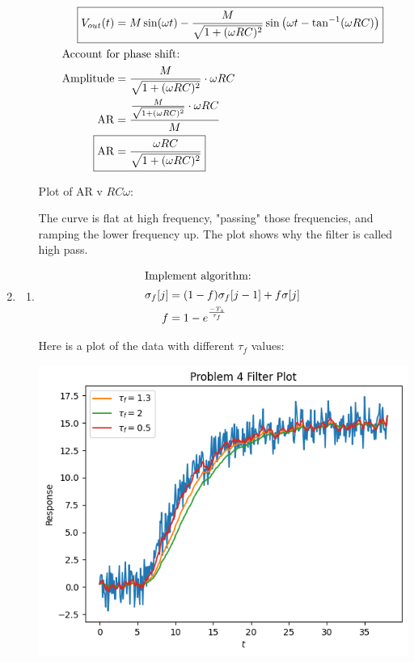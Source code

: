 \documentclass[12pt]{article}
\begin{document}
\begin{enumerate}
\begin{enumerate}
\begin{align*}
        \Aboxed{V_{out}(t) &= M\sin(\omega t) - \frac{M}{\sqrt{1+(\omega RC)^2}} \sin\left(\omega t - \tan^{-1}(\omega RC)\right)} \\
        \intertext{Account for phase shift:}
        \mathrm{Amplitude} &= \frac{M}{\sqrt{1+(\omega RC)^2}} \cdot \omega RC \\
        \mathrm{AR} &= \frac{\frac{M}{\sqrt{1+(\omega RC)^2}} \cdot \omega RC}{M} \\
        \Aboxed{\mathrm{AR} &= \frac{\omega RC}{\sqrt{1+(\omega RC)^2}}}
    \end{align*}

    Plot of AR v $RC\omega$:

    

    The curve is flat at high frequency, "passing" those frequencies, and ramping the lower frequency up. The plot shows why the filter is called high pass.  
\end{enumerate}


\newpage
\item
\begin{enumerate}
    \item 
    \begin{align*}
        \intertext{Implement algorithm:}
        \sigma_f[j] &= (1 - f) \sigma_f[j - 1] + f \sigma[j] \\ 
        f &= 1 - e^{\frac{-T_s}{\tau_f}}
    \end{align*}

    Here is a plot of the data with different $\tau_f$ values:

    \includegraphics{461HW4_P4_1.png}


\end{enumerate}
\end{enumerate}
\end{document}
